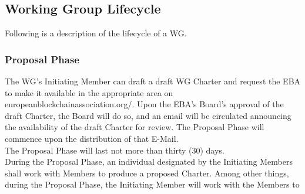 \documentclass{article}
\begin{document}
\subsection{Working Group Lifecycle}

Following is a description of the lifecycle of a WG.

\subsubsection{Proposal Phase}

The WG’s Initiating Member can draft a draft WG Charter and request the EBA to make it available in the appropriate area on europeanblockchainassociation.org/. 
Upon the EBA's Board's approval of the draft Charter, the Board will do so, and an email will be circulated announcing the availability of the draft Charter for review. 
The Proposal Phase will commence upon the distribution of that E-Mail. \\
The Proposal Phase will last not more than thirty (30) days. \\
During the Proposal Phase, an individual designated by the Initiating Members shall work with Members to produce a proposed Charter. 
Among other things, during the Proposal Phase, the Initiating Member will work with the Members to
\end{document}
